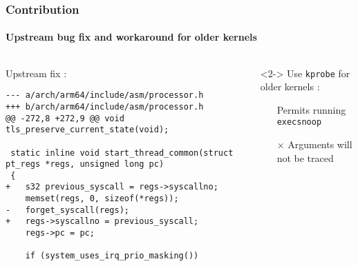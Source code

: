 \documentclass[table, trans, aspectratio = 169]{beamer}
\begin{document}
	\begin{frame}[fragile]
		\frametitle{Contribution}
		\framesubtitle{Upstream bug fix and workaround for older kernels}

		\begin{columns}
			\begin{column}{.5\textwidth}
				\centering
				Upstream fix \cite{linux_kernel_contributors_arm64_2022}:
				\begin{tiny}
					\begin{verbatim}
--- a/arch/arm64/include/asm/processor.h
+++ b/arch/arm64/include/asm/processor.h
@@ -272,8 +272,9 @@ void tls_preserve_current_state(void);

 static inline void start_thread_common(struct pt_regs *regs, unsigned long pc)
 {
+	s32 previous_syscall = regs->syscallno;
 	memset(regs, 0, sizeof(*regs));
-	forget_syscall(regs);
+	regs->syscallno = previous_syscall;
 	regs->pc = pc;

 	if (system_uses_irq_prio_masking())
					\end{verbatim}
				\end{tiny}
			\end{column}
			\begin{column}{.5\textwidth}<2->
				\centering
				Use \texttt{kprobe} for older kernels \cite{inspektor_gadget_contributors_pkggadgets_2022}:
				\begin{itemize}
					\item[\checkmark] Permits running \texttt{execsnoop}
					\item[$\times$] Arguments will not be traced
				\end{itemize}
			\end{column}
		\end{columns}

	\end{frame}
\end{document}
